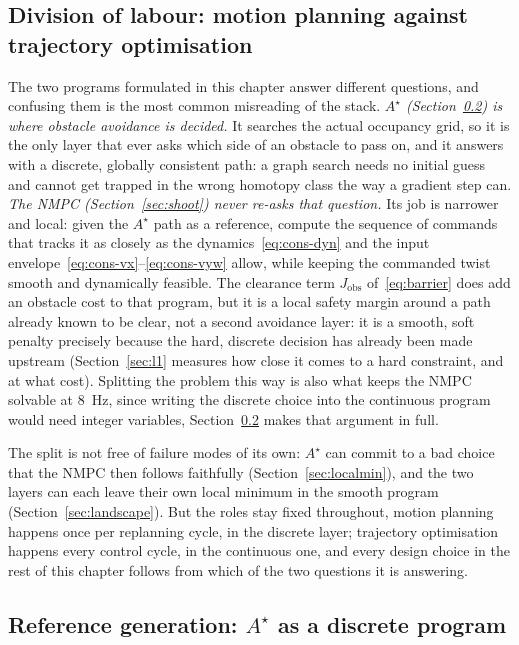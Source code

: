 \documentclass[11pt,a4paper]{article}
\newcommand{\astar}{$A^\star$}
\newcommand{\Jobs}{J_{\mathrm{obs}}}
\begin{document}
\subsection{Division of labour: motion planning against trajectory optimisation}
\label{sec:division}

The two programs formulated in this chapter answer different questions, and confusing them is the most
common misreading of the stack. \emph{\astar{} (Section~\ref{sec:astar}) is where obstacle avoidance is
decided.} It searches the actual occupancy grid, so it is the only layer that ever asks which side of an
obstacle to pass on, and it answers with a discrete, globally consistent path: a graph search needs no
initial guess and cannot get trapped in the wrong homotopy class the way a gradient step can.
\emph{The NMPC (Section~\ref{sec:shoot}) never re-asks that question.} Its job is narrower and local: given
the \astar{} path as a reference, compute the sequence of commands that tracks it as closely as the
dynamics~\eqref{eq:cons-dyn} and the input envelope~\eqref{eq:cons-vx}--\eqref{eq:cons-vyw} allow, while
keeping the commanded twist smooth and dynamically feasible. The clearance term $\Jobs$ of~\eqref{eq:barrier}
does add an obstacle cost to that program, but it is a local safety margin around a path already known to be
clear, not a second avoidance layer: it is a smooth, soft penalty precisely because the hard, discrete
decision has already been made upstream (Section~\ref{sec:l1} measures how close it comes to a hard
constraint, and at what cost). Splitting the problem this way is also what keeps the NMPC solvable at
$8$~Hz, since writing the discrete choice into the continuous program would need integer variables,
Section~\ref{sec:astar} makes that argument in full.

The split is not free of failure modes of its own: \astar{} can commit to a bad choice that the NMPC then
follows faithfully (Section~\ref{sec:localmin}), and the two layers can each leave their own local minimum in
the smooth program (Section~\ref{sec:landscape}). But the roles stay fixed throughout, motion planning
happens once per replanning cycle, in the discrete layer; trajectory optimisation happens every control
cycle, in the continuous one, and every design choice in the rest of this chapter follows from which of
the two questions it is answering.

\subsection{Reference generation: \texorpdfstring{\astar{}}{A*} as a discrete program}
\label{sec:astar}
\end{document}
